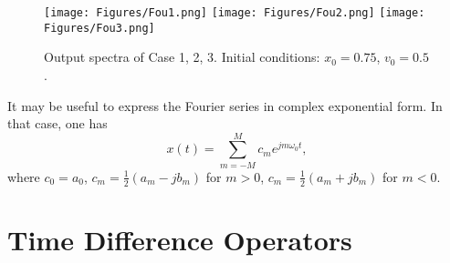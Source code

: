\documentclass[11pt,twoside,a4paper,english]{book}
\begin{document}
\begin{figure}
\texttt{[image: Figures/Fou1.png]}
\texttt{[image: Figures/Fou2.png]}
\texttt{[image: Figures/Fou3.png]}
\caption{Output spectra of Case 1, 2, 3. Initial conditions: $x_0 = 0.75$, $v_0 = 0.5$.}\label{fig:Fou1}
\end{figure}

It may be useful to express the Fourier series in complex exponential form. In that case, one has
\begin{equation}\label{eq:FourierSeriesComplex}
x(t) = \sum_{m=-M}^M c_m e^{jm\omega_0 t},
\end{equation}
where $c_0 = a_0$, $c_m = \frac{1}{2}\left( a_m - j b_m\right)$ for $m>0$, $c_m = \frac{1}{2}\left( a_m + j b_m\right)$ for $m<0$.














\section{Time Difference Operators}
\end{document}
